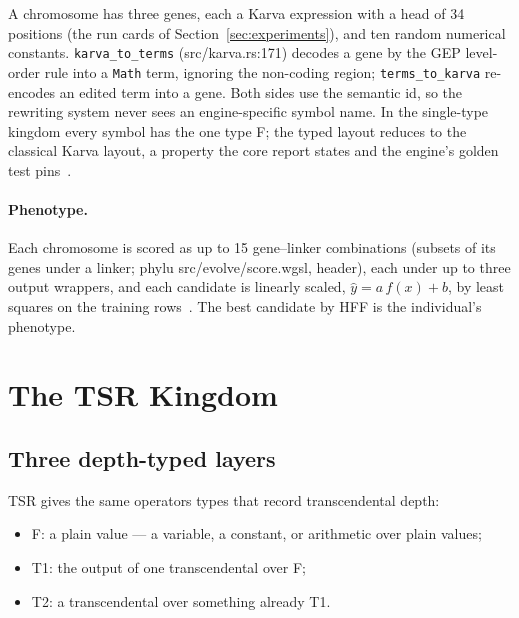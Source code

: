 \documentclass[sigconf,nonacm]{acmart}
\newcommand{\ty}[1]{\textsf{#1}}
\newcommand{\src}[1]{{\small\ttfamily #1}}
\begin{document}
A chromosome has three genes, each a Karva expression with a head of 34
positions (the run cards of Section~\ref{sec:experiments}), and ten random
numerical constants. \texttt{karva\_to\_terms} (\src{src/\allowbreak{}karva.\allowbreak{}rs:171}) decodes
a gene by the GEP level-order rule into a \texttt{Math} term, ignoring the
non-coding region; \texttt{terms\_to\_karva} re-encodes an edited term into a
gene. Both sides use the semantic id, so the rewriting system never sees an
engine-specific symbol name. In the single-type kingdom every symbol has the one
type \ty{F}; the typed layout reduces to the classical Karva layout, a
property the core report states and the engine's golden test pins~\cite{morgan_core}.

\paragraph{Phenotype.} Each chromosome is scored as up to 15 gene--linker
combinations (subsets of its genes under a linker; \src{phylu
src/\allowbreak{}evolve/\allowbreak{}score.\allowbreak{}wgsl}, header), each under up to three output wrappers, and each
candidate is linearly scaled, $\hat y = a\,f(x)+b$, by least squares on the
training rows~\cite{keijzer2003scaling}. The best candidate by HFF is the
individual's phenotype.

\section{The TSR Kingdom}
\label{sec:tsr}

\subsection{Three depth-typed layers}

TSR gives the same operators types that record transcendental depth:

\begin{itemize}
\item \ty{F}: a plain value --- a variable, a constant, or arithmetic over
plain values;
\item \ty{T1}: the output of one transcendental over \ty{F};
\item \ty{T2}: a transcendental over something already \ty{T1}.
\end{itemize}
\end{document}
